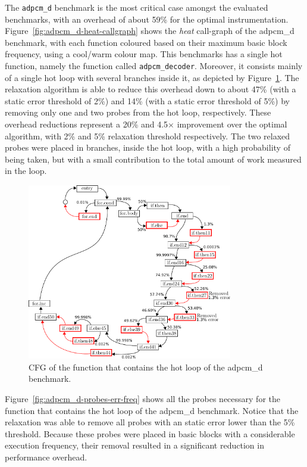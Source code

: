 The \texttt{adpcm\_d} benchmark is the most critical case amongst the evaluated benchmarks, with an overhead of about 59\% for the optimal instrumentation.
Figure~\ref{fig:adpcm_d-heat-callgraph} shows the \textit{heat} call-graph of the {\flagstype adpcm\_d} benchmark, with each function coloured based on their maximum basic block frequency, using a cool/warm colour map.
This benchmarks has a single hot function, namely the function called \verb|adpcm_decoder|.
Moreover, it consists mainly of a single hot loop with several branches inside it, as depicted by Figure~\ref{fig:adpcm_d-cfg-instr}.
The relaxation algorithm is able to reduce this overhead down to about 47\% (with a static error threshold of 2\%) and 14\% (with a static error threshold of 5\%) by removing only one and two probes from the hot loop, respectively.
These overhead reductions represent a 20\% and 4.5$\times$ improvement over the optimal algorithm, with 2\% and 5\% relaxation threshold respectively.
The two relaxed probes were placed in branches, inside the hot loop, with a high probability of being taken, but with a small contribution to the total amount of work measured in the loop.

\begin{figure}[htb]
    \centering
    \includegraphics[width=0.8\textwidth]{figs/adpcm_d-cfg-instr.pdf}
    \caption{CFG of the function that contains the hot loop of the {\flagstype adpcm\_d} benchmark.}
    \label{fig:adpcm_d-cfg-instr}
\end{figure}

Figure~\ref{fig:adpcm_d-probes-err-freq} shows all the probes necessary for the function that contains the hot loop of the {\flagstype adpcm\_d} benchmark.
Notice that the relaxation was able to remove all probes with an static error lower than the 5\% threshold.
Because these probes were placed in basic blocks with a considerable execution frequency, their removal resulted in a significant reduction in performance overhead.

